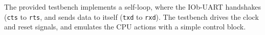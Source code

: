 %

The provided testbench implements a self-loop, where the IOb-UART handshakes
({\tt cts} to {\tt rts}, and sends data to itself ({\tt txd} to {\tt rxd}). The
testbench drives the clock and reset signals, and emulates the CPU actions with
a simple control block.
